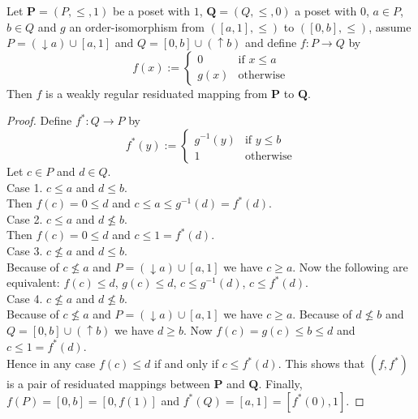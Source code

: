 \documentclass[10pt,a4paper]{amsart}
\begin{document}
\begin{theorem}
Let $\mathbf P=(P,\le,1)$ be a poset with $1$, $\mathbf Q=(Q,\le,0)$ a poset with $0$, $a\in P$, $b\in Q$ and $g$ an order-isomorphism from $([a,1],\le)$ to $([0,b],\le)$, assume $P=(\downarrow a)\cup[a,1]$ and $Q=[0,b]\cup(\uparrow b)$ and define $f\colon P\to Q$ by
\[
f(x):=\left\{
\begin{array}{ll}
0    & \text{if }x\le a \\
g(x) & \text{otherwise}
\end{array}
\right.
\]
Then $f$ is a weakly regular residuated mapping from $\mathbf P$ to $\mathbf Q$.
\end{theorem}

\begin{proof}
Define $f^*\colon Q\to P$ by
\[
f^*(y):=\left\{
\begin{array}{ll}
g^{-1}(y) & \text{if }y\le b \\
1         & \text{otherwise}
\end{array}
\right.
\]
Let $c\in P$ and $d\in Q$. \\
Case 1. $c\le a$ and $d\le b$. \\
Then $f(c)=0\le d$ and $c\le a\le g^{-1}(d)=f^*(d)$. \\
Case 2. $c\le a$ and $d\not\le b$. \\
Then $f(c)=0\le d$ and $c\le1=f^*(d)$. \\
Case 3. $c\not\le a$ and $d\le b$. \\
Because of $c\not\le a$ and $P=(\downarrow a)\cup[a,1]$ we have $c\ge a$. Now the following are equivalent: $f(c)\le d$, $g(c)\le d$, $c\le g^{-1}(d)$, $c\le f^*(d)$. \\
Case 4. $c\not\le a$ and $d\not\le b$. \\
Because of $c\not\le a$ and $P=(\downarrow a)\cup[a,1]$ we have $c\ge a$. Because of $d\not\le b$ and $Q=[0,b]\cup(\uparrow b)$ we have $d\ge b$. Now $f(c)=g(c)\le b\le d$ and $c\le1=f^*(d)$. \\
Hence in any case $f(c)\le d$ if and only if $c\le f^*(d)$. This shows that $(f,f^*)$ is a pair of residuated mappings between $\mathbf P$ and $\mathbf Q$. Finally, $f(P)=[0,b]=[0,f(1)]$ and $f^*(Q)=[a,1]=[f^*(0),1]$.
\end{proof}
\end{document}

